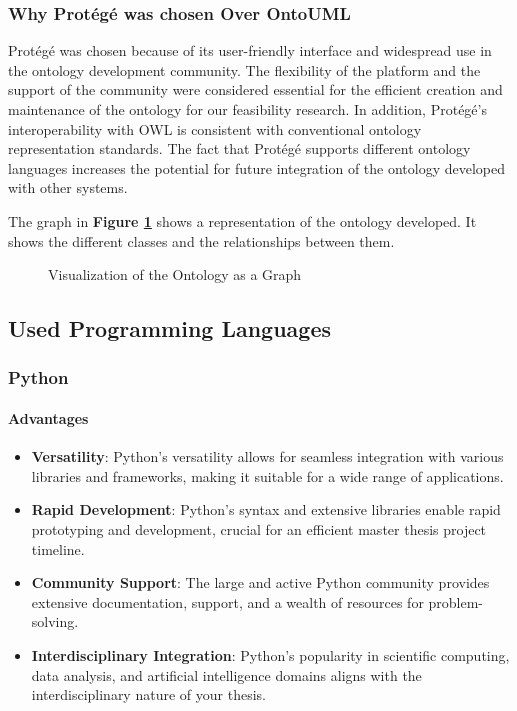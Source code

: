     \subsubsection{Why Protégé was chosen Over OntoUML}
    Protégé was chosen because of its user-friendly interface and widespread use in the ontology development community. The flexibility of the platform and the support of the community were considered essential for the efficient creation and maintenance of the ontology for our feasibility research. In addition, Protégé's interoperability with OWL is consistent with conventional ontology representation standards. The fact that Protégé supports different ontology languages increases the potential for future integration of the ontology developed with other systems.
    
    The graph in \textbf{Figure \ref{fig:viz-ontology}} shows a representation of the ontology developed. It shows the different classes and the relationships between them.
    
    \begin{figure}[p]
        
         \caption{\label{fig:viz-ontology}  Visualization of the Ontology as a Graph}
    \end{figure}

    
\subsection{Used Programming Languages}
    \subsubsection{Python}
        \paragraph{Advantages}
        \begin{itemize}
            \item \textbf{Versatility}: Python's versatility allows for seamless integration with various libraries and frameworks, making it suitable for a wide range of applications.
            \item \textbf{Rapid Development}: Python's syntax and extensive libraries enable rapid prototyping and development, crucial for an efficient master thesis project timeline.
            \item \textbf{Community Support}: The large and active Python community provides extensive documentation, support, and a wealth of resources for problem-solving.
            \item \textbf{Interdisciplinary Integration}: Python's popularity in scientific computing, data analysis, and artificial intelligence domains aligns with the interdisciplinary nature of your thesis.
        \end{itemize}
        
